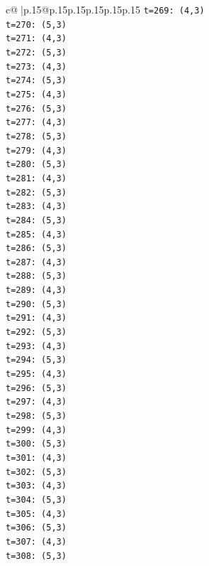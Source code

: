 \documentclass{article}
\begin{document}
{\begin{supertabular}{c@{$\;$}|p{.15\linewidth}@{}p{.15\linewidth}p{.15\linewidth}p{.15\linewidth}p{.15\linewidth}p{.15\linewidth}}
{{{\texttt{t=269: (4,3)} \\
\texttt{t=270: (5,3)} \\
\texttt{t=271: (4,3)} \\
\texttt{t=272: (5,3)} \\
\texttt{t=273: (4,3)} \\
\texttt{t=274: (5,3)} \\
\texttt{t=275: (4,3)} \\
\texttt{t=276: (5,3)} \\
\texttt{t=277: (4,3)} \\
\texttt{t=278: (5,3)} \\
\texttt{t=279: (4,3)} \\
\texttt{t=280: (5,3)} \\
\texttt{t=281: (4,3)} \\
\texttt{t=282: (5,3)} \\
\texttt{t=283: (4,3)} \\
\texttt{t=284: (5,3)} \\
\texttt{t=285: (4,3)} \\
\texttt{t=286: (5,3)} \\
\texttt{t=287: (4,3)} \\
\texttt{t=288: (5,3)} \\
\texttt{t=289: (4,3)} \\
\texttt{t=290: (5,3)} \\
\texttt{t=291: (4,3)} \\
\texttt{t=292: (5,3)} \\
\texttt{t=293: (4,3)} \\
\texttt{t=294: (5,3)} \\
\texttt{t=295: (4,3)} \\
\texttt{t=296: (5,3)} \\
\texttt{t=297: (4,3)} \\
\texttt{t=298: (5,3)} \\
\texttt{t=299: (4,3)} \\
\texttt{t=300: (5,3)} \\
\texttt{t=301: (4,3)} \\
\texttt{t=302: (5,3)} \\
\texttt{t=303: (4,3)} \\
\texttt{t=304: (5,3)} \\
\texttt{t=305: (4,3)} \\
\texttt{t=306: (5,3)} \\
\texttt{t=307: (4,3)} \\
\texttt{t=308: (5,3)} \\
}}}
\end{supertabular}}
\end{document}
